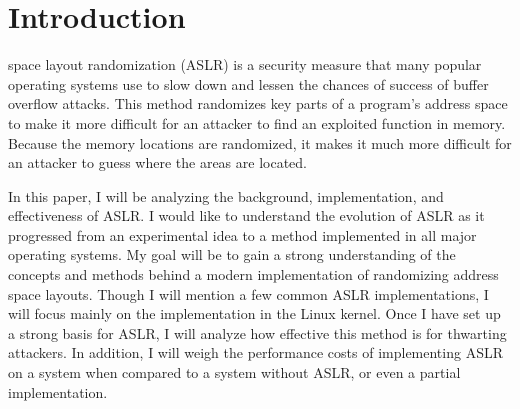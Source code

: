 \section{Introduction}
\label{s:intro} %

 space layout randomization (ASLR) is a security measure that many popular operating systems use to slow down and lessen the chances of success of buffer overflow attacks. This method randomizes key parts of a program’s address space to make it more difficult for an attacker to find an exploited function in memory. Because the memory locations are randomized, it makes it much more difficult for an attacker to guess where the areas are located.


In this paper, I will be analyzing the background, implementation, and effectiveness of ASLR. I would like to understand the evolution of ASLR as it progressed from an experimental idea to a method implemented in all major operating systems. My goal will be to gain a strong understanding of the concepts and methods behind a modern implementation of randomizing address space layouts. Though I will mention a few common ASLR implementations, I will focus mainly on the implementation in the Linux kernel. Once I have set up a strong basis for ASLR, I will analyze how effective this method is for thwarting attackers. In addition, I will weigh the performance costs of implementing ASLR on a system when compared to a system without ASLR, or even a partial implementation.

